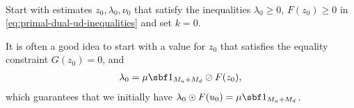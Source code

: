 \documentclass[11pt]{article}
\begin{document}
\begin{algorithm}~\label{al:primal-dual}
\begin{steps}
\item Start with estimates $z_0,\lambda_0,\nu_0$ that satisfy the inequalities
  $\lambda_0\ge 0$, $F(z_0)\ge 0$ in \eqref{eq:primal-dual-ud-inequalities} and set $k=0$.

  It is often a good idea to start with a value for $z_0$ that
  satisfies the equality constraint $G(z_0)=0$, and
  \begin{align*}
    \lambda_0=\mu\sbf 1_{M_u+M_d}\oslash F(z_0),
  \end{align*}
  which guarantees that we initially have
  $\lambda_0\odot F(u_0)=\mu\sbf 1_{M_u+M_d}$.



\end{steps}
\end{algorithm}
\end{document}

